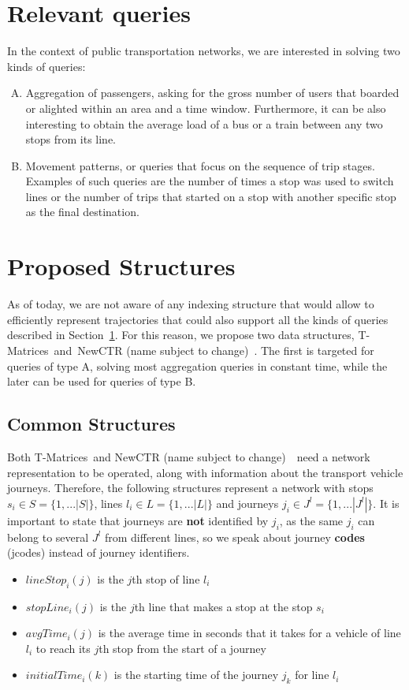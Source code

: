 \documentclass[runningheads]{llncs}
\newcommand{\acumm}{T-Matrices} %
\newcommand{\ctr}{NewCTR (name subject to change)\ }
\begin{document}
\section{Relevant queries}
\label{seq:rq}
In the context of public transportation networks, we are interested in solving two kinds of queries:

\begin{enumerate}[A)]
    \item Aggregation of passengers, asking for the gross number of users that boarded or alighted within an area and a time window. Furthermore, it can be also interesting to obtain the average load of a bus or a train between any two stops from its line.
    \item Movement patterns, or queries that focus on the sequence of trip stages. Examples of such queries are the number of times a stop was used to switch lines or the number of trips that started on a stop with another specific stop as the final destination.
\end{enumerate}

\section{Proposed Structures}
\label{seq:ps}

As of today, we are not aware of any indexing structure that would allow to efficiently represent trajectories that could also support all the kinds of queries described in Section~\ref{seq:rq}. For this reason, we propose two data structures, \acumm~and~\ctr. The first is targeted for queries of type A, solving most aggregation queries in constant time, while the later can be used for queries of type B.

\subsection{Common Structures}
Both \acumm~and \ctr~need a network representation to be operated, along with information about the transport vehicle journeys. Therefore, the following structures represent a network with stops $s_i \in S = \{1,...|S|\}$, lines $l_i \in L = \{1,...|L|\}$ and journeys $j_i \in J^l = \{1,...|J^l|\}$. It is important to state that journeys are \textbf{not} identified by $j_i$, as the same $j_i$ can belong to several $J^l$ from different lines, so we speak about journey \textbf{codes} (jcodes) instead of journey identifiers.

\begin{itemize}
    \item $lineStop_i(j)$ is the $j$th stop of line $l_i$
    \item $stopLine_i(j)$ is the $j$th line that makes a stop at the stop $s_i$
    \item $avgTime_i(j)$ is the average time in seconds that it takes for a vehicle of line $l_i$ to reach its $j$th stop from the start of a journey
    \item $initialTime_i(k)$ is the starting time of the journey $j_k$ for line $l_i$
\end{itemize}
\end{document}
